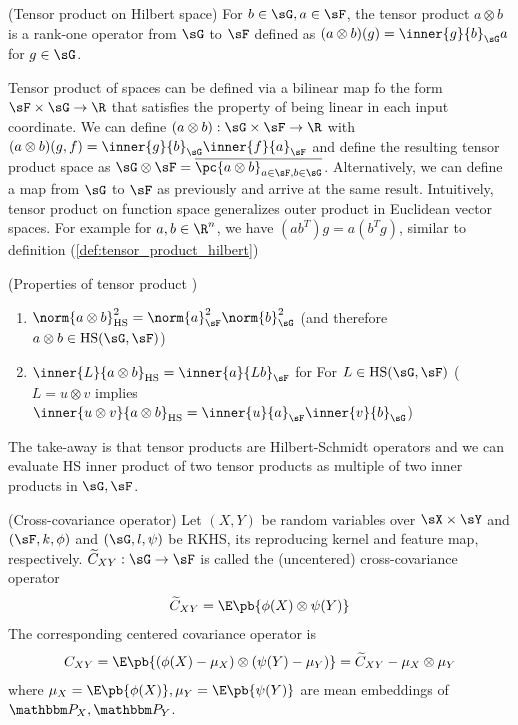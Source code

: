 \documentclass[11pt]{article}
\begin{document}
\begin{definition}
    \label{def:tensor_product_hilbert}
    (Tensor product on Hilbert space) For $b\in\sG,a\in \sF$, the tensor product $a\otimes b$ is a rank-one operator from $\sG$ to $\sF$ defined as $(a\otimes b)(g) = \inner{g}{b}_{\sG} a$ for $g\in\sG$.
\end{definition}

Tensor product of spaces can be defined via a bilinear map fo the form $\sF\times\sG\to\R$ that satisfies the property of being linear in each input coordinate. We can define $(a\otimes b): \sG\times\sF\to\R$ with $(a\otimes b)(g,f) =\inner{g}{b}_{\sG}\inner{f}{a}_{\sF}$ and define the resulting tensor product space as $\sG\otimes \sF = \overline{\pc{a\otimes b}_{a\in\sF,b\in\sG}}$. Alternatively, we can define a map from $\sG$ to $\sF$ as previously and arrive at the same result. Intuitively, tensor product on function space generalizes outer product in Euclidean vector spaces. For example for $a,b\in\R^n$, we have $(ab^T)g = a(b^Tg)$, similar to definition (\ref{def:tensor_product_hilbert})

\begin{proposition}
    (Properties of tensor product \cite{grettonNotesMeanEmbeddings2019}) 
    \begin{enumerate}
        \item $\norm{a\otimes b}_{\text{HS}}^2 = \norm{a}_{\sF}^2 \norm{b}_{\sG}^2$ (and therefore $a\otimes b \in \text{HS}(\sG,\sF)$)
        \item $\inner{L}{a\otimes b}_{\text{HS}} = \inner{a}{Lb}_{\sF}$ for For $L\in\text{HS}(\sG,\sF)$ ($L=u\otimes v$ implies $\inner{u\otimes v}{a\otimes b}_{\text{HS}} = \inner{u}{a}_{\sF} \inner{v}{b}_{\sG}$)
    \end{enumerate}
\end{proposition}

The take-away is that tensor products are Hilbert-Schmidt operators and we can evaluate HS inner product of two tensor products as multiple of two inner products in $\sG,\sF$.

\begin{definition}
    (Cross-covariance operator) Let $(X,Y)$ be random variables over $\sX\times\sY$ and $(\sF,k,\phi)$ and $(\sG,l,\psi)$ be RKHS, its reproducing kernel and feature map, respectively. $\widetilde{C}_{XY}:\sG\to\sF$ is called the (uncentered) cross-covariance operator
    \begin{align}
        \widetilde{C}_{XY}
            = \E\pb{ \phi(X) \otimes \psi(Y) }
    \end{align}
    The corresponding centered covariance operator is 
    \begin{align}
        C_{XY} 
            = \E\pb{ (\phi(X)-\mu_X)\otimes (\psi(Y)-\mu_Y) }
            = \widetilde{C}_{XY} - \mu_{X} \otimes \mu_{Y}
    \end{align}
    where $\mu_X = \E\pb{\phi(X)}, \mu_Y = \E\pb{\psi(Y)}$ are mean embeddings of $\bbP_X,\bbP_Y$.
\end{definition}
\end{document}
